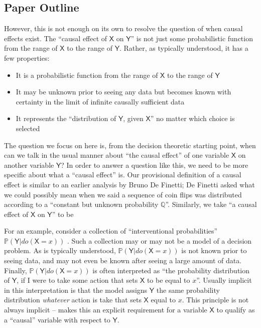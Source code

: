 \documentclass{article}
\theoremstyle{plain}
\theoremstyle{definition}
\newcommand{\RV}[1]{\ensuremath{\mathsf{#1}}}
\newcommand{\prob}[1]{\ensuremath{\mathbb{#1}}}
\begin{document}
\subsection{Paper Outline}


However, this is not enough on its own to resolve the question of when causal effects exist. The ``causal effect of $\RV{X}$ on $\RV{Y}$'' is not just some probabilistic function from the range of $\RV{X}$ to the range of $\RV{Y}$. Rather, as typically understood, it has a few properties:

\begin{itemize}
  \item It is a probabilistic function from the range of $\RV{X}$ to the range of $\RV{Y}$
  \item It may be unknown prior to seeing any data but becomes known with certainty in the limit of infinite causally sufficient data
  \item It represents the ``distribution of $\RV{Y}$, given $\RV{X}$'' no matter which choice is selected
\end{itemize}

The question we focus on here is, from the decision theoretic starting point, when can we talk in the usual manner about ``the causal effect'' of one variable $\RV{X}$ on another variable $\RV{Y}$? In order to answer a question like this, we need to be more specific about what a ``causal effect'' is. Our provisional definition of a causal effect is similar to an earlier analysis by Bruno De Finetti; De Finetti asked what we could possibly mean when we said a sequence of coin flips was distributed according to a ``constant but unknown probability $\prob{Q}$''\citet{de_finetti_foresight_1992}. Similarly, we take ``a causal effect of $\RV{X}$ on $\RV{Y}$'' to be


For an example, consider a collection of ``interventional probabilities'' $\prob{P}(\RV{Y}|do(\RV{X}=x))$ \citep[chap. 1.3]{pearl_causality:_2009}. Such a collection may or may not be a model of a decision problem. As is typically understood, $\prob{P}(\RV{Y}|do(\RV{X}=x))$ is not known prior to seeing data, and may not even be known after seeing a large amount of data. Finally, $\prob{P}(\RV{Y}|do(\RV{X}=x))$ is often interpreted as ``the probability distribution of $\RV{Y}$, if I were to take some action that sets $\RV{X}$ to be equal to $x$''. Usually implicit in this interpretation is that the model assigns $\RV{Y}$ the same probability distribution \emph{whatever} action is take that sets $\RV{X}$ equal to $x$. This principle is not always implicit -- \citet{chalupka_causal_2017} makes this an explicit requirement for a variable $\RV{X}$ to qualify as a ``causal'' variable with respect to $\RV{Y}$.
\end{document}
